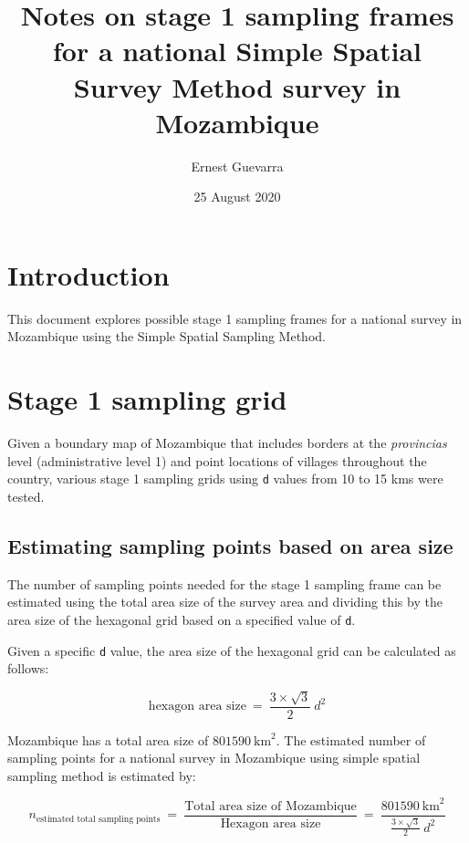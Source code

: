 \documentclass[
  12pt,
  a4paper]{article}
\title{\vspace{8cm} Notes on stage 1 sampling frames for a national Simple Spatial Survey Method survey in Mozambique}
\author{Ernest Guevarra}
\date{25 August 2020}
\begin{document}
\maketitle

\newpage

\newpage

\hypertarget{introduction}{%
\section{Introduction}\label{introduction}}

This document explores possible stage 1 sampling frames for a national survey in Mozambique using the Simple Spatial Sampling Method.

\hypertarget{stage-1-sampling-grid}{%
\section{Stage 1 sampling grid}\label{stage-1-sampling-grid}}

Given a boundary map of Mozambique that includes borders at the \emph{provincias} level (administrative level 1) and point locations of villages throughout the country, various stage 1 sampling grids using \texttt{d} values from 10 to 15 kms were tested.

\hypertarget{estimating-sampling-points-based-on-area-size}{%
\subsection{Estimating sampling points based on area size}\label{estimating-sampling-points-based-on-area-size}}

The number of sampling points needed for the stage 1 sampling frame can be estimated using the total area size of the survey area and dividing this by the area size of the hexagonal grid based on a specified value of \texttt{d}.

Given a specific \texttt{d} value, the area size of the hexagonal grid can be calculated as follows:

\[ \text{hexagon area size} ~ = ~ \frac{3 \times \sqrt{3}}{2} ~ d ^ 2  \]

Mozambique has a total area size of \(801590 ~ \text{km} ^ 2\). The estimated number of sampling points for a national survey in Mozambique using simple spatial sampling method is estimated by:

\[ n_\text{estimated total sampling points} ~ = ~ \frac{\text{Total area size of Mozambique}}{\text{Hexagon area size}} ~ = ~ \frac{801590 ~ \text{km} ^ 2}{\frac{3 \times \sqrt{3}}{2} ~ d ^ 2} \]
\end{document}
